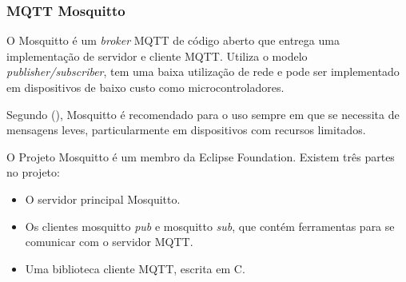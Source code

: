 \subsubsection{MQTT Mosquitto}

O Mosquitto é um \textit{broker} MQTT de código aberto \cite{Kodali2017} que entrega uma implementação de servidor e cliente MQTT. Utiliza o modelo \textit{publisher/subscriber}, tem uma baixa utilização de rede e pode ser implementado em dispositivos de baixo custo como microcontroladores. \cite{Light}

Segundo \citeauthor{Light} (\citeyear{Light}), Mosquitto é recomendado para o uso sempre em que se necessita de mensagens leves, particularmente em dispositivos com recursos limitados.

O Projeto Mosquitto é um membro da Eclipse Foundation. Existem três partes no projeto:

\begin{itemize}
	\item O servidor principal Mosquitto.
	\item Os clientes mosquitto \textit{pub} e mosquitto \textit{sub}, que contém ferramentas para se comunicar com o servidor MQTT.
	\item Uma biblioteca cliente MQTT, escrita em C.
\end{itemize}

